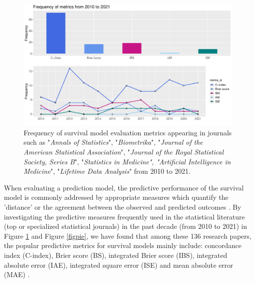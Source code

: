 \begin{figure}[h]
\centering
\begin{center}
\includegraphics[width=\textwidth]{bothbarline.pdf}
\caption{
Frequency of survival model evaluation metrics appearing in journals such as "\emph{Annals of Statistics}", "\emph{Biometrika}", "\emph{Journal of the American Statistical Association}", "\emph{Journal of the Royal Statistical Society, Series B}", "\emph{Statistics in Medicine", "Artificial Intelligence in Medicine}", "\emph{Lifetime Data Analysis}" from 2010 to 2021.}\label{figbarline}
\end{center}
\end{figure}

When evaluating a prediction model, the predictive performance of the survival model is commonly addressed by appropriate measures which quantify the 'distance' or the agreement between the observed and predicted outcomes \citep{uno.2011, bylinskii.2018}. By investigating the predictive measures frequently used in the statistical literature (top or specialized statistical journals) in the past decade (from 2010 to 2021) in Figure \ref{figbarline} and Figure \ref{figpie}, we have found that among these 136 research papers, the popular predictive metrics for survival models mainly include: concordance index (C-index), Brier score (BS), integrated Brier score (IBS), integrated absolute error (IAE), integrated square error (ISE) and mean absolute error (MAE) \citep{Harrell.1982, Brier.1950, Graf.1999, Hoora.2017, Schemper.1992}.


